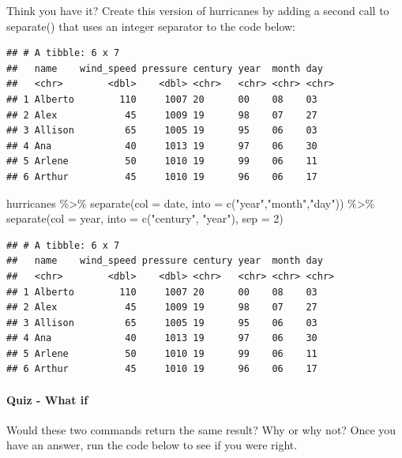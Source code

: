 \documentclass[
]{article}
\newenvironment{Shaded}{\begin{snugshade}}{\end{snugshade}}
\newcommand{\AttributeTok}[1]{\textcolor[rgb]{0.77,0.63,0.00}{#1}}
\newcommand{\DecValTok}[1]{\textcolor[rgb]{0.00,0.00,0.81}{#1}}
\newcommand{\FunctionTok}[1]{\textcolor[rgb]{0.00,0.00,0.00}{#1}}
\newcommand{\NormalTok}[1]{#1}
\newcommand{\SpecialCharTok}[1]{\textcolor[rgb]{0.00,0.00,0.00}{#1}}
\newcommand{\StringTok}[1]{\textcolor[rgb]{0.31,0.60,0.02}{#1}}
\begin{document}
Think you have it? Create this version of hurricanes by adding a second
call to separate() that uses an integer separator to the code below:

\begin{verbatim}
## # A tibble: 6 x 7
##   name    wind_speed pressure century year  month day  
##   <chr>        <dbl>    <dbl> <chr>   <chr> <chr> <chr>
## 1 Alberto        110     1007 20      00    08    03   
## 2 Alex            45     1009 19      98    07    27   
## 3 Allison         65     1005 19      95    06    03   
## 4 Ana             40     1013 19      97    06    30   
## 5 Arlene          50     1010 19      99    06    11   
## 6 Arthur          45     1010 19      96    06    17
\end{verbatim}

\begin{Shaded}
\begin{Highlighting}[]
\NormalTok{hurricanes }\SpecialCharTok{\%\textgreater{}\%} 
  \FunctionTok{separate}\NormalTok{(}\AttributeTok{col =}\NormalTok{ date, }\AttributeTok{into =} \FunctionTok{c}\NormalTok{(}\StringTok{"year"}\NormalTok{,}\StringTok{"month"}\NormalTok{,}\StringTok{"day"}\NormalTok{)) }\SpecialCharTok{\%\textgreater{}\%}
  \FunctionTok{separate}\NormalTok{(}\AttributeTok{col =}\NormalTok{ year, }\AttributeTok{into =} \FunctionTok{c}\NormalTok{(}\StringTok{"century"}\NormalTok{, }\StringTok{"year"}\NormalTok{), }\AttributeTok{sep =} \DecValTok{2}\NormalTok{)}
\end{Highlighting}
\end{Shaded}

\begin{verbatim}
## # A tibble: 6 x 7
##   name    wind_speed pressure century year  month day  
##   <chr>        <dbl>    <dbl> <chr>   <chr> <chr> <chr>
## 1 Alberto        110     1007 20      00    08    03   
## 2 Alex            45     1009 19      98    07    27   
## 3 Allison         65     1005 19      95    06    03   
## 4 Ana             40     1013 19      97    06    30   
## 5 Arlene          50     1010 19      99    06    11   
## 6 Arthur          45     1010 19      96    06    17
\end{verbatim}

\hypertarget{quiz---what-if}{%
\paragraph{Quiz - What if}\label{quiz---what-if}}

Would these two commands return the same result? Why or why not? Once
you have an answer, run the code below to see if you were right.
\end{document}
